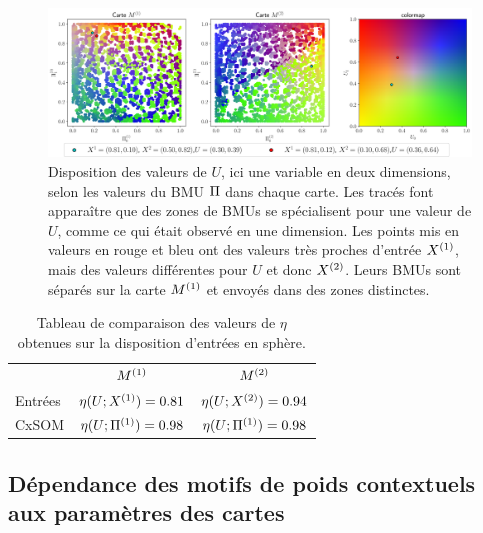 \documentclass[../main]{subfiles}
\begin{document}
\begin{figure}[ht]
	\includegraphics[width=\textwidth]{U_BMU_2SOM_2D.png}
	\caption{Disposition des valeurs de $U$, ici une variable en deux dimensions, selon les valeurs du BMU $\Pi$ dans chaque carte. Les tracés font apparaître que des zones de BMUs se spécialisent pour une valeur de $U$, comme ce qui était observé en une dimension. Les points mis en valeurs en rouge et bleu ont des valeurs très proches d'entrée $X^{({1})}$, mais des valeurs différentes pour $U$ et donc $X^{({2})}$. Leurs BMUs sont séparés sur la carte $M^{({1})}$ et envoyés dans des zones distinctes.
	\label{fig:U_BMU}}
\end{figure}


\begin{table}[hb]
	\caption{Tableau de comparaison des valeurs de $\eta$ obtenues sur la disposition d'entrées en sphère. \label{tab:eta2D}}
	\centering\begin{tabular}{lcc}
						&$M^{({1})}$ 					& $M^{({2})}$ 						\\
		Entrées 		& $\eta(U;X^{({1})}) = 0.81$ & $\eta(U;X^{({2})}) = 0.94$  \\
		CxSOM  	 		& $\eta(U;\Pi^{({1})}) = 0.98$ & $\eta(U;\Pi^{({1})}) = 0.98$ 	\\
	\end{tabular}
\end{table}

\subsection{Dépendance des motifs de poids contextuels aux paramètres des cartes \label{par:params2D}}
\end{document}
